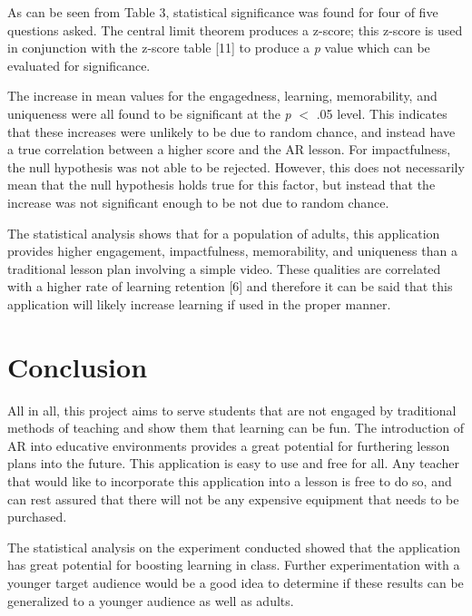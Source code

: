 \documentclass{vgtc}                          %
\begin{document}
As can be seen from Table 3, statistical significance was found for four of five questions asked. The central limit theorem produces a z-score; this z-score is used in conjunction with the z-score table [11] to produce a \emph{p} value which can be evaluated for significance. 
\vspace*{4mm}

The increase in mean values for the engagedness, learning, memorability, and uniqueness were all found to be significant at the \emph{p} $<$ .05 level. This indicates that these increases were unlikely to be due to random chance, and instead have a true correlation between a higher score and the AR lesson. For impactfulness, the null hypothesis was not able to be rejected. However, this does not necessarily mean that the null hypothesis holds true for this factor, but instead that the increase was not significant enough to be not due to random chance. 
\vspace*{4mm}

The statistical analysis shows that for a population of adults, this application provides higher engagement, impactfulness, memorability, and uniqueness than a traditional lesson plan involving a simple video. These qualities are correlated with a higher rate of learning retention [6] and therefore it can be said that this application will likely increase learning if used in the proper manner. 
\vspace*{4mm}


\section{Conclusion}

All in all, this project aims to serve students that are not engaged by traditional methods of teaching and show them that learning can be fun. The introduction of AR into educative environments provides a great potential for furthering lesson plans into the future. This application is easy to use and free for all. Any teacher that would like to incorporate this application into a lesson is free to do so, and can rest assured that there will not be any expensive equipment that needs to be purchased. 
\vspace*{4mm}

The statistical analysis on the experiment conducted showed that the application has great potential for boosting learning in class. Further experimentation with a younger target audience would be a good idea to determine if these results can be generalized to a younger audience as well as adults. 
\vspace*{4mm}
\end{document}
